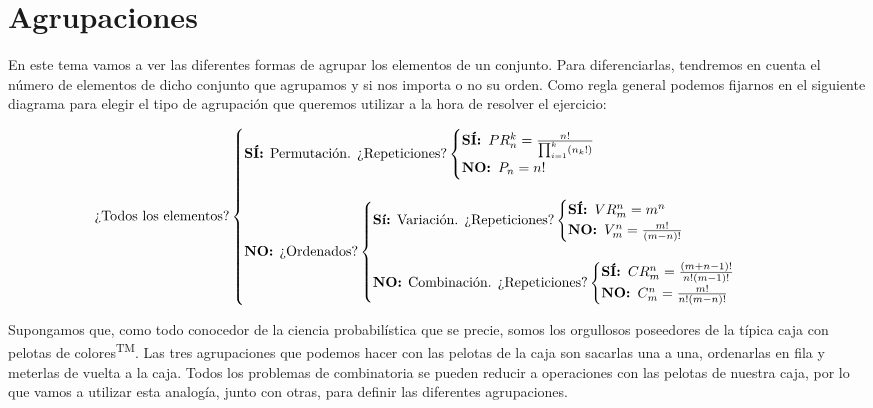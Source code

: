 \section{Agrupaciones}\label{agrupaciones}

En este tema vamos a ver las diferentes formas de agrupar los elementos de un conjunto.
Para diferenciarlas, tendremos en cuenta el número de elementos de dicho conjunto que agrupamos y si nos importa o no su orden.
Como regla general podemos fijarnos en el siguiente diagrama para elegir el tipo de agrupación que queremos utilizar a la hora de resolver el ejercicio:

\[
	\text{¿Todos los elementos?}
	\begin{cases}
		\text{\textbf{SÍ\@:} Permutación. ¿Repeticiones?}
		\begin{cases}
			\text{\textbf{SÍ\@: }} PR_{n}^{k} = \frac{n!}{\prod_{i=1}^{k}(n_k!)} \\
			\text{\textbf{NO\@: }} P_n = n! \\
		\end{cases}
		\\
		\\
		\text{\textbf{NO\@:} ¿Ordenados?}
		\begin{cases}
			\text{\textbf{Sí\@:} Variación. ¿Repeticiones?}
			\begin{cases}
				\text{\textbf{SÍ\@: }} VR_{m}^{n} = m^n \\
				\text{\textbf{NO\@: }} V_{m}^{n} = \frac{m!}{(m-n)!} \\
			\end{cases}
			\\
			\\
			\text{\textbf{NO\@:} Combinación. ¿Repeticiones?}
			\begin{cases}
				\text{\textbf{SÍ\@: }} CR_{m}^{n} = \frac{(m+n-1)!}{n!(m-1)!} \\
				\text{\textbf{NO\@: }} C_{m}^{n} = \frac{m!}{n!(m-n)!}
			\end{cases}
		\end{cases}
	\end{cases}
\]

Supongamos que, como todo conocedor de la ciencia probabilística que se precie, somos los orgullosos poseedores de la típica caja con pelotas de colores\textsuperscript{TM}.
Las tres agrupaciones que podemos hacer con las pelotas de la caja son sacarlas una a una, ordenarlas en fila y meterlas de vuelta a la caja.
Todos los problemas de combinatoria se pueden reducir a operaciones con las pelotas de nuestra caja, por lo que vamos a utilizar esta analogía, junto con otras, para definir las diferentes agrupaciones.

